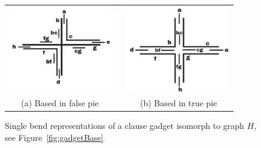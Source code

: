 \begin{figure}[htb]
  \centering
  \begin{tabular}{c c c }
    \includegraphics[width=4.5cm]{./img/falsePie.png}  %
    & &\includegraphics[width=4.5cm]{./img/truePie.png} %
    \\%
    {\footnotesize (a) Based in false pie}  & &  {\footnotesize(b) Based in true pie}\\
  \end{tabular}
  \caption{Single bend representations of a clause gadget isomorph to graph $H$, see Figure~\ref{fig:gadgetBase}}\label{fig:falseAndTruePie}
\end{figure} 